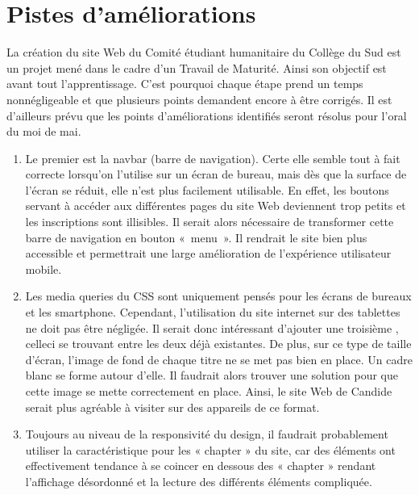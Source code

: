 \documentclass[a4,10pt,french]{sphinxmanual}
\begin{document}
\section{Pistes d’améliorations}
\label{\detokenize{chapitre-03:pistes-dameliorations}}
\sphinxAtStartPar
La création du site Web du Comité étudiant humanitaire du Collège du Sud est un projet mené dans le cadre d’un Travail de Maturité. Ainsi son objectif est avant tout l’apprentissage. C’est pourquoi chaque étape prend un temps non\sphinxhyphen{}négligeable et que plusieurs points demandent encore à être corrigés. Il est d’ailleurs prévu que les points d’améliorations identifiés seront résolus pour l’oral du moi de mai.
\begin{enumerate}
%
\item {} 
\sphinxAtStartPar
Le premier est la nav\sphinxhyphen{}bar (barre de navigation). Certe elle semble tout à fait correcte lorsqu’on l’utilise sur un écran de bureau, mais dès que la surface de l’écran se réduit, elle n’est plus facilement utilisable. En effet, les boutons servant à accéder aux différentes pages du site Web deviennent trop petits et les inscriptions sont illisibles. Il serait alors nécessaire de transformer cette barre de navigation en bouton « menu ». Il rendrait le site bien plus accessible et permettrait une large amélioration de l’expérience utilisateur mobile.

\item {} 
\sphinxAtStartPar
Les media queries du CSS sont uniquement pensés pour les écrans de bureaux et les smartphone. Cependant, l’utilisation du site internet sur des tablettes ne doit pas être négligée. Il serait donc intéressant d’ajouter une troisième , celle\sphinxhyphen{}ci se trouvant entre les deux déjà existantes. De plus, sur ce type de taille d’écran, l’image de fond de chaque titre ne se met pas bien en place. Un cadre blanc se forme autour d’elle. Il faudrait alors trouver une solution pour que cette image se mette correctement en place. Ainsi, le site Web de Candide serait plus agréable à visiter sur des appareils de ce format.

\item {} 
\sphinxAtStartPar
Toujours au niveau de la responsivité du design, il faudrait probablement utiliser la caractéristique  pour les « chapter » du site, car des éléments ont effectivement tendance à se coincer en dessous des « chapter » rendant l’affichage désordonné et la lecture des différents éléments compliquée.


\end{enumerate}
\end{document}
